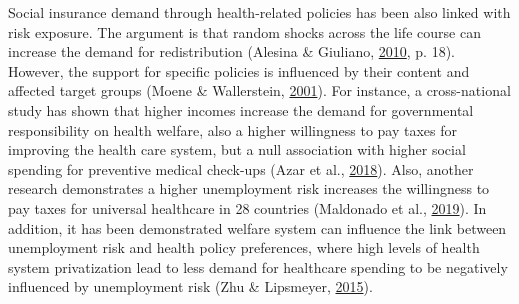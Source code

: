 \documentclass[
  12pt,
]{book}
\begin{document}
Social insurance demand through health-related policies has been also linked with risk exposure. The argument is that random shocks across the life course can increase the demand for redistribution (Alesina \& Giuliano, \protect\hyperlink{ref-alesina_preferences_2010}{2010}, p. 18). However, the support for specific policies is influenced by their content and affected target groups (Moene \& Wallerstein, \protect\hyperlink{ref-moene_inequality_2001}{2001}). For instance, a cross-national study has shown that higher incomes increase the demand for governmental responsibility on health welfare, also a higher willingness to pay taxes for improving the health care system, but a null association with higher social spending for preventive medical check-ups (Azar et al., \protect\hyperlink{ref-Azaretal2018}{2018}). Also, another research demonstrates a higher unemployment risk increases the willingness to pay taxes for universal healthcare in 28 countries (Maldonado et al., \protect\hyperlink{ref-Maldonadoetal2019}{2019}). In addition, it has been demonstrated welfare system can influence the link between unemployment risk and health policy preferences, where high levels of health system privatization lead to less demand for healthcare spending to be negatively influenced by unemployment risk (Zhu \& Lipsmeyer, \protect\hyperlink{ref-zhu_policy_2015}{2015}).
\end{document}
